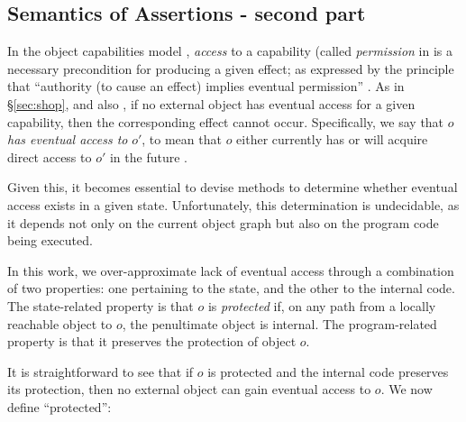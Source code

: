 \subsection{Semantics of Assertions - second part}  

\label{sect:protect}
In the object capabilities model \cite{MillerPhD}, \emph{access} to a capability (called \emph{permission} in \cite{MillerPhD}
 is a necessary precondition  for producing a given effect;  as expressed by the principle that ``authority (to cause an effect) implies eventual permission'' \cite{permissionAuthority}.
As   in \S \ref{sec:shop}, and also \cite{OOPSLA22}, if no external object has eventual access for a given capability, then the corresponding effect cannot occur.
 Specifically,  we say that $o$ \emph{has eventual access to} $o'$, to mean  that $o$ either currently has or will acquire direct access to $o'$ in the future \cite{permissionAuthority}.



Given this, it becomes essential to devise methods to determine whether eventual access exists in a given state. 
Unfortunately, this determination is undecidable, as it depends not only on the current object graph but also on the program code being executed.

In this work, we over-approximate lack of eventual access through a combination of two properties: one pertaining to the state, and the other to the internal code. 
The state-related property is that   $o$ is \emph{protected} if, on any path from a locally reachable object to $o$, the penultimate object  is internal. 
The program-related property is that it preserves the protection of object $o$.

It is straightforward to see that if $o$ is protected and the internal code preserves its protection, then no external object can gain eventual access to $o$.
We now define ``protected'':


